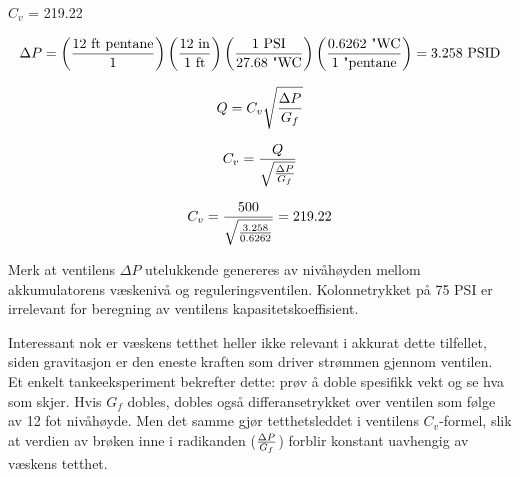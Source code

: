 





$C_v$ = 219.22







$$\Delta P = \left(12 \hbox{ ft pentane} \over 1 \right)  \left(12 \hbox{ in} \over 1 \hbox{ ft}\right)  \left(1 \hbox{ PSI} \over 27.68 \hbox{ "WC}\right)  \left(0.6262 \hbox{ "WC} \over 1 \hbox{ "pentane}\right) = 3.258 \hbox{ PSID}$$

$$Q = C_v \sqrt{\Delta P \over G_f}$$

$$C_v = {Q \over \sqrt{\Delta P \over G_f}}$$

$$C_v = {500 \over \sqrt{3.258 \over 0.6262}} = 219.22$$

\vskip 10pt

Merk at ventilens $\Delta P$ utelukkende genereres av nivåhøyden mellom akkumulatorens væskenivå og reguleringsventilen. Kolonnetrykket på 75 PSI er irrelevant for beregning av ventilens kapasitetskoeffisient.

Interessant nok er væskens tetthet heller ikke relevant i akkurat dette tilfellet, siden gravitasjon er den eneste kraften som driver strømmen gjennom ventilen. Et enkelt tankeeksperiment bekrefter dette: prøv å doble spesifikk vekt og se hva som skjer. Hvis $G_f$ dobles, dobles også differansetrykket over ventilen som følge av 12 fot nivåhøyde. Men det samme gjør tetthetsleddet i ventilens $C_v$-formel, slik at verdien av brøken inne i radikanden ($\Delta P \over G_f$) forblir konstant uavhengig av væskens tetthet.



